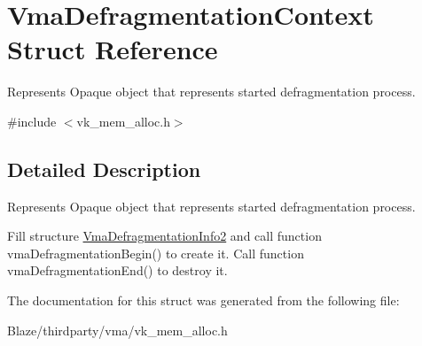 \hypertarget{structVmaDefragmentationContext}{}\section{Vma\+Defragmentation\+Context Struct Reference}
\label{structVmaDefragmentationContext}


Represents Opaque object that represents started defragmentation process.  




{\ttfamily \#include $<$vk\+\_\+mem\+\_\+alloc.\+h$>$}



\subsection{Detailed Description}
Represents Opaque object that represents started defragmentation process. 

Fill structure \hyperlink{structVmaDefragmentationInfo2}{Vma\+Defragmentation\+Info2} and call function vma\+Defragmentation\+Begin() to create it. Call function vma\+Defragmentation\+End() to destroy it. 

The documentation for this struct was generated from the following file\+:\begin{DoxyCompactItemize}
\item 
Blaze/thirdparty/vma/vk\+\_\+mem\+\_\+alloc.\+h\end{DoxyCompactItemize}
